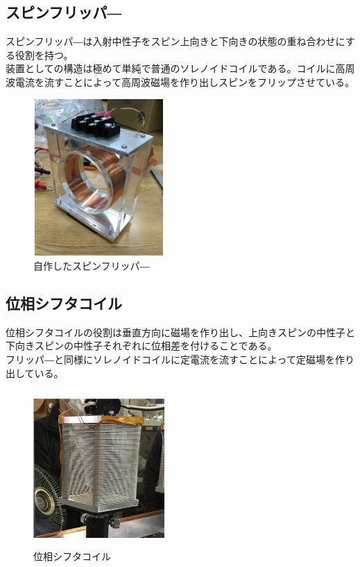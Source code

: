 \subsection{スピンフリッパ―}
スピンフリッパ―は入射中性子をスピン上向きと下向きの状態の重ね合わせにする役割を持つ。\\
装置としての構造は極めて単純で普通のソレノイドコイルである。コイルに高周波電流を流すことによって高周波磁場を作り出しスピンをフリップさせている。
\begin{figure}[H]
\begin{center}
\includegraphics[width=5cm,height=6cm]{device/spinflipperphoto.pdf}\caption{自作したスピンフリッパ―}
\end{center}
\end{figure}
\subsection{位相シフタコイル}
位相シフタコイルの役割は垂直方向に磁場を作り出し、上向きスピンの中性子と下向きスピンの中性子それぞれに位相差を付けることである。\\
フリッパ―と同様にソレノイドコイルに定電流を流すことによって定磁場を作り出している。
\begin{figure}[H]
\begin{center}
\includegraphics[width=5cm,height=6cm]{device/shifterphoto.pdf}\caption{位相シフタコイル}
\end{center}
\end{figure}